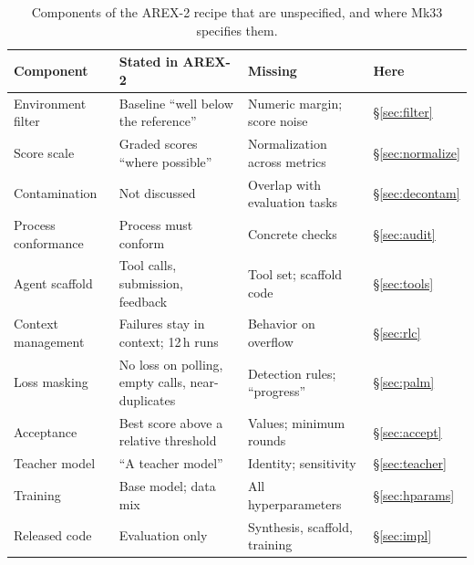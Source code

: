 \documentclass[11pt]{article}
\begin{document}
\begin{table}[t]
\centering
\small
\caption{Components of the AREX-2 recipe that are unspecified, and where Mk33 specifies them.}
\label{tab:gaps}
\begin{tabularx}{\linewidth}{@{}l Y Y l@{}}
\toprule
Component & Stated in AREX-2 & Missing & Here \\
\midrule
Environment filter & Baseline ``well below the reference'' & Numeric margin; score noise & \S\ref{sec:filter} \\
Score scale & Graded scores ``where possible'' & Normalization across metrics & \S\ref{sec:normalize} \\
Contamination & Not discussed & Overlap with evaluation tasks & \S\ref{sec:decontam} \\
Process conformance & Process must conform & Concrete checks & \S\ref{sec:audit} \\
Agent scaffold & Tool calls, submission, feedback & Tool set; scaffold code & \S\ref{sec:tools} \\
Context management & Failures stay in context; 12\,h runs & Behavior on overflow & \S\ref{sec:rlc} \\
Loss masking & No loss on polling, empty calls, near-duplicates & Detection rules; ``progress'' & \S\ref{sec:palm} \\
Acceptance & Best score above a relative threshold & Values; minimum rounds & \S\ref{sec:accept} \\
Teacher model & ``A teacher model'' & Identity; sensitivity & \S\ref{sec:teacher} \\
Training & Base model; data mix & All hyperparameters & \S\ref{sec:hparams} \\
Released code & Evaluation only & Synthesis, scaffold, training & \S\ref{sec:impl} \\
\bottomrule
\end{tabularx}
\end{table}
\end{document}
